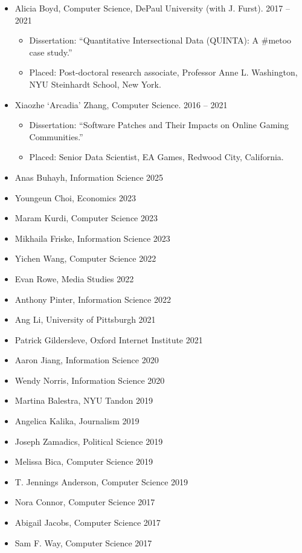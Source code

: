 \documentclass{cv}
\begin{document}
\begin{itemize}
\begin{itemize}
			\item Placed: Tenure-track Assistant Professor, Department of Computer Science, Whitman College, Walla Walla, Washington.
		\end{itemize}
		\item Alicia Boyd, Computer Science, DePaul University (with J. Furst). \hfill 2017 -- 2021
		\begin{itemize}
			\item Dissertation: ``Quantitative Intersectional Data (QUINTA): A \#metoo case study.''
			\item Placed: Post-doctoral research associate, Professor Anne L. Washington, NYU Steinhardt School, New York.
		\end{itemize}
		\item Xiaozhe `Arcadia' Zhang, Computer Science. \hfill 2016 -- 2021
		\begin{itemize}
			\item Dissertation: ``Software Patches and Their Impacts on Online Gaming Communities.''
			\item Placed: Senior Data Scientist, EA Games, Redwood City, California.
		\end{itemize}
	\end{itemize}

	\begin{itemize}
		\item Anas Buhayh, Information Science \hfill 2025
		\item Youngeun Choi, Economics \hfill 2023
		\item Maram Kurdi, Computer Science \hfill 2023
		\item Mikhaila Friske, Information Science \hfill 2023
		\item Yichen Wang, Computer Science \hfill 2022
		\item Evan Rowe, Media Studies \hfill 2022
		\item Anthony Pinter, Information Science \hfill 2022
		\item Ang Li, University of Pittsburgh \hfill 2021
		\item Patrick Gildersleve, Oxford Internet Institute \hfill 2021
		\item Aaron Jiang, Information Science \hfill 2020
		\item Wendy Norris, Information Science \hfill 2020
		\item Martina Balestra, NYU Tandon \hfill 2019
		\item Angelica Kalika, Journalism \hfill 2019
		\item Joseph Zamadics, Political Science \hfill 2019
		\item Melissa Bica, Computer Science \hfill 2019
		\item T. Jennings Anderson, Computer Science \hfill 2019
		\item Nora Connor, Computer Science \hfill 2017
		\item Abigail Jacobs, Computer Science \hfill 2017
		\item Sam F. Way, Computer Science \hfill 2017
	\end{itemize}
\end{document}
